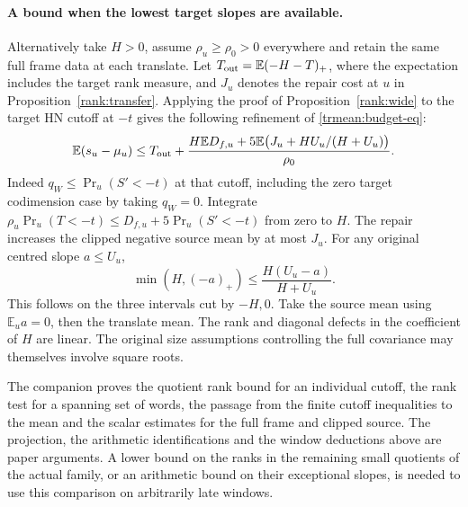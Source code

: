 \paragraph{A bound when the lowest target slopes are available.}
Alternatively take \(H>0\), assume \(\rho_u\ge\rho_0>0\) everywhere
and retain the same full frame data at each translate. Let
\(T_{\rm out}=\mathbb E(-H-T)_+\), where the expectation includes
the target rank measure, and \(J_u\) denotes the repair cost at \(u\)
in Proposition~\ref{rank:transfer}. Applying the proof of
Proposition~\ref{rank:wide} to the target HN cutoff at \(-t\)
gives the following refinement of \eqref{trmean:budget-eq}:
\[
 \mathbb E(s_u-\mu_u)\le T_{\rm out}
  +\frac{H\mathbb E D_{f,u}
       +5\mathbb E\bigl(J_u+HU_u/(H+U_u)\bigr)}{\rho_0}.
\]
Indeed \(q_W\le\Pr_u(S'<-t)\) at that cutoff, including the zero
target codimension case by taking \(q_W=0\). Integrate
\(\rho_u\Pr_u(T<-t)\le D_{f,u}+5\Pr_u(S'<-t)\) from zero to \(H\).
The repair increases the clipped negative source mean by at most
\(J_u\). For any original centred slope \(a\le U_u\),
\[
       \min(H,(-a)_+)\le\frac{H(U_u-a)}{H+U_u}.
\]
This follows on the three intervals cut by \(-H,0\). Take the
source mean using \(\mathbb E_u a=0\), then the translate mean.
The rank and diagonal defects in the coefficient of \(H\) are
linear. The original size assumptions controlling the full
covariance may themselves involve square roots.

The companion  proves the quotient
rank bound for an individual cutoff, the rank test for a spanning
set of words, the passage from the finite cutoff inequalities to the mean and the scalar
estimates for the full frame and clipped source. The projection,
the arithmetic identifications and the window deductions above
are paper arguments. A lower bound on the ranks in the remaining
small quotients of the actual family, or an arithmetic bound on
their exceptional slopes, is needed to use this comparison on
arbitrarily late windows.
